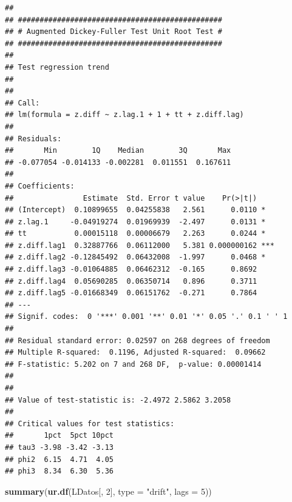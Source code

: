 \documentclass[
]{book}
\newenvironment{Shaded}{\begin{snugshade}}{\end{snugshade}}
\newcommand{\AttributeTok}[1]{\textcolor[rgb]{0.13,0.29,0.53}{#1}}
\newcommand{\DecValTok}[1]{\textcolor[rgb]{0.00,0.00,0.81}{#1}}
\newcommand{\FunctionTok}[1]{\textcolor[rgb]{0.13,0.29,0.53}{\textbf{#1}}}
\newcommand{\NormalTok}[1]{#1}
\newcommand{\StringTok}[1]{\textcolor[rgb]{0.31,0.60,0.02}{#1}}
\begin{document}
\begin{verbatim}
## 
## ############################################### 
## # Augmented Dickey-Fuller Test Unit Root Test # 
## ############################################### 
## 
## Test regression trend 
## 
## 
## Call:
## lm(formula = z.diff ~ z.lag.1 + 1 + tt + z.diff.lag)
## 
## Residuals:
##       Min        1Q    Median        3Q       Max 
## -0.077054 -0.014133 -0.002281  0.011551  0.167611 
## 
## Coefficients:
##                Estimate  Std. Error t value    Pr(>|t|)    
## (Intercept)  0.10899655  0.04255838   2.561      0.0110 *  
## z.lag.1     -0.04919274  0.01969939  -2.497      0.0131 *  
## tt           0.00015118  0.00006679   2.263      0.0244 *  
## z.diff.lag1  0.32887766  0.06112000   5.381 0.000000162 ***
## z.diff.lag2 -0.12845492  0.06432008  -1.997      0.0468 *  
## z.diff.lag3 -0.01064885  0.06462312  -0.165      0.8692    
## z.diff.lag4  0.05690285  0.06350714   0.896      0.3711    
## z.diff.lag5 -0.01668349  0.06151762  -0.271      0.7864    
## ---
## Signif. codes:  0 '***' 0.001 '**' 0.01 '*' 0.05 '.' 0.1 ' ' 1
## 
## Residual standard error: 0.02597 on 268 degrees of freedom
## Multiple R-squared:  0.1196, Adjusted R-squared:  0.09662 
## F-statistic: 5.202 on 7 and 268 DF,  p-value: 0.00001414
## 
## 
## Value of test-statistic is: -2.4972 2.5862 3.2058 
## 
## Critical values for test statistics: 
##       1pct  5pct 10pct
## tau3 -3.98 -3.42 -3.13
## phi2  6.15  4.71  4.05
## phi3  8.34  6.30  5.36
\end{verbatim}

\begin{Shaded}
\begin{Highlighting}[]
\FunctionTok{summary}\NormalTok{(}\FunctionTok{ur.df}\NormalTok{(LDatos[, }\DecValTok{2}\NormalTok{], }\AttributeTok{type =} \StringTok{"drift"}\NormalTok{, }\AttributeTok{lags =} \DecValTok{5}\NormalTok{))}
\end{Highlighting}
\end{Shaded}
\end{document}
